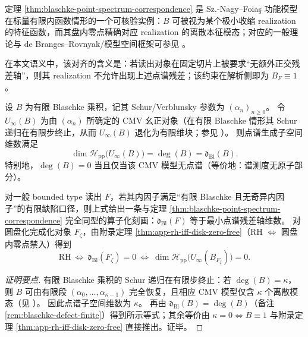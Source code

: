 \begin{remark}\label{rem:blaschke-characteristic-function-alignment}
定理 \ref{thm:blaschke-point-spectrum-correspondence} 是 Sz.-Nagy--Foia\c{s} 功能模型在标量有限内函数情形的一个可核验实例：\(B\) 可被视为某个极小收缩 realization 的特征函数，而其盘内零点精确对应 realization 的离散本征模态；对应的一般理论与 de Branges--Rovnyak/模型空间框架可参见 \cite{SzNagyFoiasBercoviciKerchy2010HarmonicAnalysis,Sarason1994SubHardyHilbertSpaces}。
\par
在本文语义中，该对齐的含义是：若读出对象在固定切片上被要求“无额外正交残差轴”，则其 realization 不允许出现上述点谱残差；该约束在解析侧即为 \(B_F\equiv 1\)。
\end{remark}

\begin{corollary}\label{cor:xi-cmv-point-spectrum-dimension-equals-blaschke-degree}
设 \(B\) 为有限 Blaschke 乘积，记其 Schur/Verblunsky 参数为 \((\alpha_n)_{n\ge 0}\)。
令 \(U_\infty(B)\) 为由 \((\alpha_n)\) 所确定的 CMV 幺正对象（在有限 Blaschke 情形其 Schur 递归在有限步终止，从而 \(U_\infty(B)\) 退化为有限维块；参见 \cite{Simon2005OPUC1}）。
则点谱生成子空间维数满足
\[
\boxed{\;\dim\mathcal H_{\mathrm{pp}}\!\bigl(U_\infty(B)\bigr)=\deg(B)=\mathfrak d_{\mathrm{Bl}}(B).\;}
\]
特别地，\(\deg(B)=0\) 当且仅当该 CMV 模型无点谱（等价地：谱测度无原子部分）。
\par
对一般 bounded type 读出 \(F\)，若其内因子满足“有限 Blaschke 且无奇异内因子”的有限缺陷口径，则上式给出一条与定理 \ref{thm:blaschke-point-spectrum-correspondence} 完全同型的算子化刻画：\(\mathfrak d_{\mathrm{Bl}}(F)\) 等于最小点谱残差轴维数。
对圆盘化完成化对象 \(F_\zeta\)，由附录定理 \ref{thm:app-rh-iff-disk-zero-free}（RH \(\Longleftrightarrow\) 圆盘内零点禁入）得到
\[
\mathrm{RH}
\ \Longleftrightarrow\
\mathfrak d_{\mathrm{Bl}}(F_\zeta)=0
\ \Longleftrightarrow\
\dim\mathcal H_{\mathrm{pp}}\!\bigl(U_\infty(B_{F_\zeta})\bigr)=0.
\]
\end{corollary}

\begin{proof}[证明要点]
有限 Blaschke 乘积的 Schur 递归在有限步终止：若 \(\deg(B)=\kappa\)，则 \(B\) 可由有限段 \((\alpha_0,\dots,\alpha_{\kappa-1})\) 完全恢复，且相应 CMV 模型仅含 \(\kappa\) 个离散模态（见 \cite{Simon2005OPUC1}）。
因此点谱子空间维数为 \(\kappa\)。
再由 \(\mathfrak d_{\mathrm{Bl}}(B)=\deg(B)\)（备注 \ref{rem:blaschke-defect-finite}）得到所示等式；其余等价由 \(\kappa=0\iff B\equiv 1\) 与附录定理 \ref{thm:app-rh-iff-disk-zero-free} 直接推出。证毕。
\end{proof}

